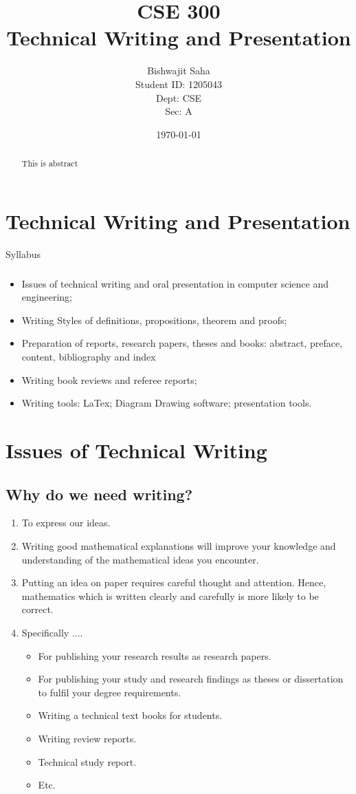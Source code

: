 \documentclass[]{report}
\title{CSE 300\\
Technical Writing and Presentation}
\author{Bishwajit Saha \\
		Student ID: 1205043\\
		Dept: CSE \\
		Sec: A
		}
\date{\today}
\begin{document}
  \maketitle
  \begin{abstract}
  This is abstract
  \end{abstract}
  \tableofcontents
  
  
  \chapter{Technical Writing and 						Presentation}
  {\Huge Syllabus}
  \paragraph{}
  \begin{itemize}
  \item Issues of technical writing and oral presentation in
computer science and engineering;
  \item Writing Styles of definitions, propositions, theorem and
proofs;
  \item Preparation of reports, research papers, theses and books:
abstract, preface, content, bibliography and index
 \item Writing book reviews and referee reports;
 \item Writing tools: LaTex; Diagram Drawing software;
presentation tools.
  \end{itemize}
  
  
  \chapter{Issues of Technical Writing}
  
  \section{Why do we need writing?}
  \begin{enumerate}
  \item To express our ideas.
  \item Writing good mathematical explanations will improve your
knowledge and understanding of the mathematical ideas you
encounter.
\item Putting an idea on paper requires careful thought and attention.
Hence, mathematics which is written clearly and carefully is
more likely to be correct.
\item Specifically ....
\begin{itemize}
\item For publishing your research results as research papers.
\item For publishing your study and research findings as theses
or dissertation to fulfil your degree requirements.
\item Writing a technical text books for students.
\item Writing review reports.
\item Technical study report.
\item Etc.
\end{itemize}
  \end{enumerate}
  
\end{document}
